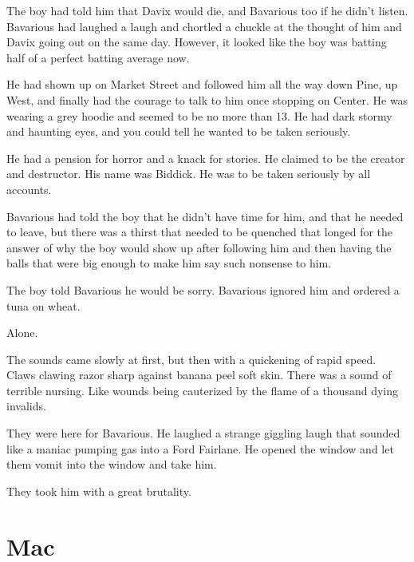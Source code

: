The boy had told him that Davix would die, and Bavarious too if he
didn't listen. Bavarious had laughed a laugh and chortled a
chuckle at the thought of him and Davix going out on the same day.
However, it looked like the boy was batting half of a perfect
batting average now.



He had shown up on Market Street and followed him all the way down
Pine, up West, and finally had the courage to talk to him once
stopping on Center. He was wearing a grey hoodie and seemed to be
no more than 13. He had dark stormy and haunting eyes, and you
could tell he wanted to be taken seriously.



He had a pension for horror and a knack for stories. He claimed to
be the creator and destructor. His name was Biddick. He was to be
taken seriously by all accounts.



Bavarious had told the boy that he didn't have time for him,
and that he needed to leave, but there was a thirst that needed to
be quenched that longed for the answer of why the boy would show up
after following him and then having the balls that were big enough
to make him say such nonsense to him.



The boy told Bavarious he would be sorry. Bavarious ignored him and
ordered a tuna on wheat.





Alone.



The sounds came slowly at first, but then with a quickening of
rapid speed. Claws clawing razor sharp against banana peel soft
skin. There was a sound of terrible nursing. Like wounds being
cauterized by the flame of a thousand dying invalids.



They were here for Bavarious. He laughed a strange giggling laugh
that sounded like a maniac pumping gas into a Ford Fairlane. He
opened the window and let them vomit into the window and take
him.



They took him with a great brutality. 

 



\chapter{Mac}




